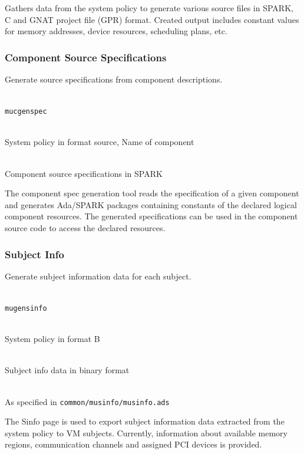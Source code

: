 \documentclass[a4paper,twoside,titlepage]{article}
\begin{document}
Gathers data from the system policy to generate various source files in SPARK,
C and GNAT project file (GPR) format. Created output includes constant values
for memory addresses, device resources, scheduling plans, etc.

\subsubsection{Component Source Specifications}
\label{sec:tools-cgen-spec}
Generate source specifications from component descriptions.

\begin{description} \itemsep1pt \parskip0pt
	\item[Name] \hfill \\
		\texttt{mucgenspec}
	\item[Input] \hfill \\
		System policy in format source, Name of component
	\item[Output] \hfill \\
		Component source specifications in SPARK
\end{description}

The component spec generation tool reads the specification of a given component
and generates Ada/SPARK packages containing constants of the declared logical
component resources. The generated specifications can be used in the component
source code to access the declared resources.

\subsubsection{Subject Info}
Generate subject information data for each subject.

\begin{description} \itemsep1pt \parskip0pt
	\item[Name] \hfill \\
		\texttt{mugensinfo}
	\item[Input] \hfill \\
		System policy in format B
	\item[Output] \hfill \\
		Subject info data in binary format
	\item[Output format] \hfill \\
		As specified in \texttt{common/musinfo/musinfo.ads}
\end{description}

The Sinfo page is used to export subject information data extracted from the
system policy to VM subjects. Currently, information about available memory
regions, communication channels and assigned PCI devices is provided.
\end{document}
